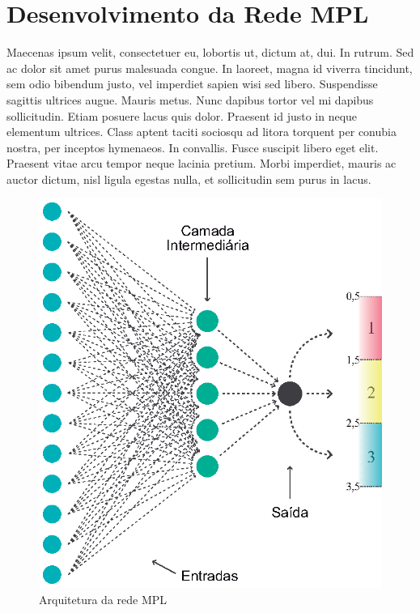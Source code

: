 
\section{Desenvolvimento da Rede MPL}

Maecenas ipsum velit, consectetuer eu, lobortis ut, dictum at, dui. In rutrum. Sed ac dolor sit amet purus malesuada congue. In laoreet, magna id viverra tincidunt, sem odio bibendum justo, vel imperdiet sapien wisi sed libero. Suspendisse sagittis ultrices augue. Mauris metus. Nunc dapibus tortor vel mi dapibus sollicitudin. Etiam posuere lacus quis dolor. Praesent id justo in neque elementum ultrices. Class aptent taciti sociosqu ad litora torquent per conubia nostra, per inceptos hymenaeos. In convallis. Fusce suscipit libero eget elit. Praesent vitae arcu tempor neque lacinia pretium. Morbi imperdiet, mauris ac auctor dictum, nisl ligula egestas nulla, et sollicitudin sem purus in lacus.

\begin{figure}[h!]

\centering %
\includegraphics{04-Figuras/Arquitetura-MPL}

\caption{Arquitetura da rede MPL}

\label{figura:arquiteturaMPL}

\end{figure}


